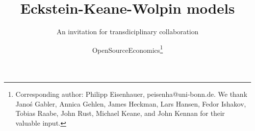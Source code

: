 
\title{Eckstein-Keane-Wolpin models}
\subtitle{An invitation for transdiciplinary collaboration}
\author{OpenSourceEconomics\thanks{Corresponding author: Philipp Eisenhauer, peisenha@uni-bonn.de. We thank  Jano\'s Gabler, Annica Gehlen, James Heckman, Lars Hansen, Fedor Ishakov, Tobias Raabe, John Rust, Michael Keane, and John Kennan for their valuable input.}}
\date{}
